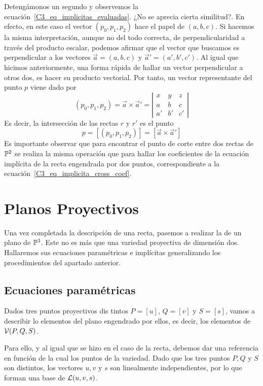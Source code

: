 Detengámonos un segundo y observemos la ecuación~\eqref{C3_eq_implicitas_evaluadas}. ¿No se aprecia cierta similitud?. En efecto, en este caso el vector $(p_0,p_1,p_2)$ hace el papel de $(a,b,c)$. Si hacemos la misma interpretación, aunque no del todo correcta, de perpendicularidad a través del producto escalar, podemos afirmar que el vector que buscamos es perpendicular a los vectores $\vec{a}=(a,b,c)$ y $\vec{a}'=(a',b',c')$. Al igual que hicimos anteriormente, una forma rápida de hallar un vector perpendicular a otros dos, es hacer su producto vectorial. Por tanto, un vector representante del punto $p$ viene dado por
\begin{equation*}
	(p_0,p_1,p_2)=\vec{a}\times \vec{a}'=\left| \begin{array}{ccc}
		x & y & z\\
		a & b & c\\
		a' & b' & c'
	\end{array}\right| 
\end{equation*}
Es decir, la intersección de las rectas $r$ y $r'$ es el punto 
\begin{equation}
	p=[(p_0,p_1,p_2)]=[\vec{a}\times \vec{a}']
\end{equation}
Es importante observar que para encontrar el punto de corte entre dos rectas de $\mathbb{P}^2$ se realiza la misma operación que para hallar los coeficientes de la ecuación implícita de la recta engendrada por dos puntos, correspondiente a la ecuación~\eqref{C3_eq_implicita_cross_coef}. 

\section{Planos Proyectivos}\label{C3_sec_planos}

Una vez completada la descripción de una recta, pasemos a realizar la de un plano de $\mathbb{P}^3$. Este no es más que una variedad proyectiva de dimensión dos. Hallaremos sus ecuaciones paramétricas e implícitas generalizando los procedimientos del apartado anterior.

\subsection{Ecuaciones paramétricas}

Dados tres puntos proyectivos dis
tintos $P=[u]$, $Q=[v]$ y $S=[s]$, vamos a describir lo elementos del plano engendrado por ellos, es decir, los elementos de $\mathcal{V}(P,Q,S)$. 

Para ello, y al igual que se hizo en el caso de la recta, debemos dar una referencia en función de la cual  los puntos de la variedad. Dado que los tres puntos $P,Q$ y $S$ son distintos, los vectores $u,v$ y $s$ son linealmente independientes, por lo que forman una base de $\mathcal{L}(u,v,s)$.

